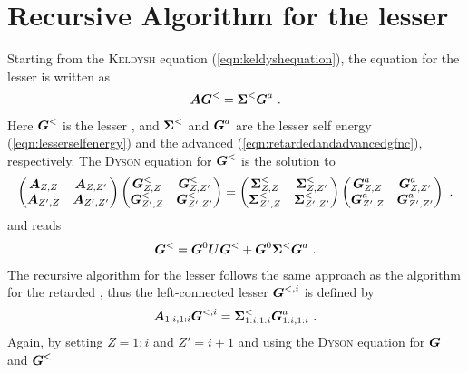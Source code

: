 \section{Recursive Algorithm for the lesser \gfnc{}}
Starting from the \textsc{Keldysh} equation (\cref{eqn:keldyshequation}), the equation for the lesser \gfnc{} is written as
\begin{align}
\boldsymbol{A}\boldsymbol{G}^< = \boldsymbol{\Sigma}^< \boldsymbol{G}^a\ .
\end{align}
Here $\boldsymbol{G}^<$ is the lesser \gfnc{}, and $\boldsymbol{\Sigma}^<$ and $\boldsymbol{G}^a$ are the lesser self energy (\cref{eqn:lesserselfenergy}) and the advanced \gfnc{} (\cref{eqn:retardedandadvancedgfnc}), respectively. The \textsc{Dyson} equation for $\boldsymbol{G}^<$ is the solution to
\begin{align}
  \begin{pmatrix} \boldsymbol{A}_{Z,Z} & \boldsymbol{A}_{Z,Z'}\\
		  \boldsymbol{A}_{Z',Z} & \boldsymbol{A}_{Z',Z'}
  \end{pmatrix}
  \begin{pmatrix} \boldsymbol{G}^<_{Z,Z} & \boldsymbol{G}^<_{Z,Z'}\\
		  \boldsymbol{G}^<_{Z',Z} & \boldsymbol{G}^<_{Z',Z'}
  \end{pmatrix} = 
  \begin{pmatrix} \boldsymbol{\Sigma}^<_{Z,Z} & \boldsymbol{\Sigma}^<_{Z,Z'}\\
		  \boldsymbol{\Sigma}^<_{Z',Z} & \boldsymbol{\Sigma}^<_{Z',Z'}
  \end{pmatrix}
  \begin{pmatrix} \boldsymbol{G}^a_{Z,Z} & \boldsymbol{G}^a_{Z,Z'}\\
		  \boldsymbol{G}^a_{Z',Z} & \boldsymbol{G}^a_{Z',Z'}
  \end{pmatrix}\ .
\end{align}
and reads
\begin{align}
\boldsymbol{G}^< = \boldsymbol{G}^0\boldsymbol{U}\boldsymbol{G}^< + \boldsymbol{G}^0\boldsymbol{\Sigma}^<\boldsymbol{G}^a\ .
\end{align}
The recursive algorithm for the lesser \gfnc{} follows the same approach as the algorithm for the retarded \gfnc{}, thus the left-connected lesser \gfnc{} $\boldsymbol{G}^{<,i}$ is defined by
\begin{align}
\mat{A}_{1:i,1:i}\mat{G}^{<,i}=\mat{\Sigma}^<_{1:i,1:i}\mat{G}^a_{1:i,1:i}\ .
\end{align}
Again, by setting $Z=1:i$ and $Z'=i+1$ and using the \textsc{Dyson} equation for $\boldsymbol{G}$ and $\boldsymbol{G}^<$
